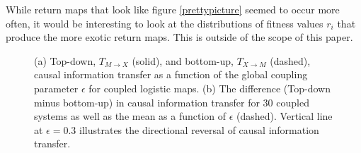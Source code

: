 \documentclass[conference]{IEEEtran}
\begin{document}

While return maps that look like figure \ref{prettypicture} seemed to occur more often, it would be interesting to look at the distributions of fitness values $r_i$ that produce the more exotic return maps.  This is outside of the scope of this paper.

\begin{figure}[!t]
\centering
{}

\hfill
{}
\caption{(a) Top-down, $T_{M\rightarrow X}$ (solid), and bottom-up, $T_{X\rightarrow M}$ (dashed), causal information transfer as a function of the global coupling parameter $\epsilon$ for coupled logistic maps. (b) The difference (Top-down minus bottom-up) in causal information transfer for $30$ coupled systems as well as the mean as a function of $\epsilon$ (dashed). Vertical line at $\epsilon = 0.3$ illustrates the directional reversal of causal information transfer.}
\label{te_avg}
\end{figure}
\end{document}
